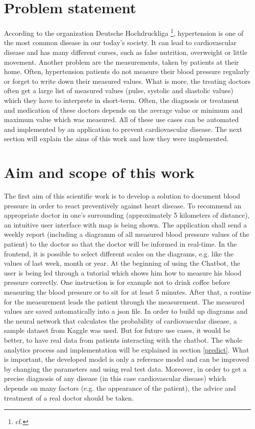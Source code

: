 \section{Problem statement}
According to the organization Deutsche Hochdruckliga \footnote{cf.\autocite{hochdruckliga}}, hypertension is one of the most common disease in our today's society. It can lead to cardiovascular disease and has many different curses, such as false nutrition, overweight or little movement.
Another problem are the measurements, taken by patients at their home. Often, hypertension patients do not measure their blood pressure regularly or forget to write down their measured values. 
What is more, the treating doctors often get a large list of measured values (pulse, systolic and diastolic values) which they have to interprete in short-term. Often, the diagnosis or treatment and medication of these doctors depends on the average value or minimum and maximum value which was measured. 
All of these use cases can be automated and implemented by an application to prevent cardiovascular disease. The next section will explain the aims of this work and how they were implemented.

\section{Aim and scope of this work}
The first aim of this scientific work is to develop a solution to document blood pressure in order to react preventively against heart disease.
To recommend an appropriate doctor in one's surrounding (approximately 5 kilometers of distance), an intuitive user interface with map is being shown.
The application shall send a weekly report (including a diagramm of all measured blood pressure values of the patient) to the doctor so that the doctor will be informed in real-time. In the frontend, it is possible to select different scales on the diagrams, e.g. like the values of last week, month or year. 
At the beginning of using the Chatbot, the user is being led through a tutorial which shows him how to measure his blood pressure correctly. One instruction is for example not to drink coffee before measuring the blood pressure or to sit for at least 5 minutes. After that, a routine for the measurement leads the patient through the measurement. The measured values are saved automatically into a \ac{json} file.
In order to build up diagrams and the neural network that calculates the probability of cardiovascular disease, a sample dataset from Kaggle was used. But for future use cases, it would be better, to have real data from patients interacting with the chatbot. The whole analytics process and implementation will be explained in section \ref{predict}. What is important, the developed model is only a reference model and can be improved by changing the parameters and using real test data. Moreover, in order to get a precise diagnosis of any disease (in this case cardiovascular disease) which depends on many factors (e.g. the appearance of the patient), the advice and treatment of a real doctor should be taken.


